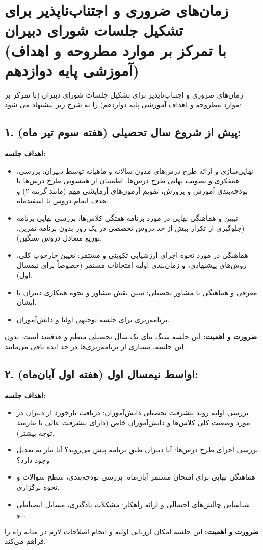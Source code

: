 \documentclass[a4paper,14pt]{article}
\begin{document}
\section*{زمان‌های ضروری و اجتناب‌ناپذیر برای تشکیل جلسات شورای دبیران \\
(با تمرکز بر موارد مطروحه و اهداف آموزشی پایه دوازدهم)}
\medskip
زمان‌های ضروری و اجتناب‌ناپذیر برای تشکیل جلسات شورای دبیران (با تمرکز بر موارد مطروحه و اهداف آموزشی پایه دوازدهم) را به شرح زیر پیشنهاد می شود:
\bigskip
\subsection*{۱. پیش از شروع سال تحصیلی (هفته سوم تیر ماه):}
\textbf{اهداف جلسه:}
\begin{itemize}
    \item نهایی‌سازی و ارائه طرح درس‌های مدون سالانه و ماهیانه توسط دبیران: بررسی، همفکری و تصویب نهایی طرح درس‌ها. اطمینان از همسویی طرح درس‌ها با بودجه‌بندی آموزش و پرورش، تقویم آزمون‌های آزمایشی مهم (مانند گزینه ۲) و هدف اتمام دروس تا اسفندماه.
    \item تبیین و هماهنگی نهایی در مورد برنامه هفتگی کلاس‌ها: بررسی نهایی برنامه  (جلوگیری از تکرار بیش از حد دروس تخصصی در یک روز بدون برنامه تمرین، توزیع متعادل دروس سنگین).
    \item هماهنگی در مورد نحوه اجرای ارزشیابی تکوینی و مستمر: تعیین چارچوب کلی، روش‌های پیشنهادی، و زمان‌بندی اولیه امتحانات مستمر (خصوصاً برای نیمسال اول).
    \item معرفی و هماهنگی با مشاور تحصیلی: تبیین نقش مشاور و نحوه همکاری دبیران با ایشان.
    \item برنامه‌ریزی برای جلسه توجیهی اولیا و دانش‌آموزان.
\end{itemize}
\textbf{ضرورت و اهمیت:} این جلسه سنگ بنای یک سال تحصیلی منظم و هدفمند است. بدون این جلسه، بسیاری از برنامه‌ریزی‌ها در حد ایده باقی می‌مانند.
\medskip

\subsection*{۲. اواسط نیمسال اول (هفته اول آبان‌ماه):}
\textbf{اهداف جلسه:}
\begin{itemize}
    \item بررسی اولیه روند پیشرفت تحصیلی دانش‌آموزان: دریافت بازخورد از دبیران در مورد وضعیت کلی کلاس‌ها و دانش‌آموزان خاص (دارای پیشرفت عالی یا نیازمند توجه بیشتر).
    \item بررسی اجرای طرح درس‌ها: آیا دبیران طبق برنامه پیش می‌روند؟ آیا نیاز به تعدیل وجود دارد؟
    \item هماهنگی نهایی برای امتحان مستمر آبان‌ماه: بررسی بودجه‌بندی، سطح سوالات و نحوه برگزاری.
    \item شناسایی چالش‌های احتمالی و ارائه راهکار: مشکلات یادگیری، مسائل انضباطی و...
\end{itemize}
\textbf{ضرورت و اهمیت:} این جلسه امکان ارزیابی اولیه و انجام اصلاحات لازم در میانه راه را فراهم می‌کند.
\medskip
\end{document}
